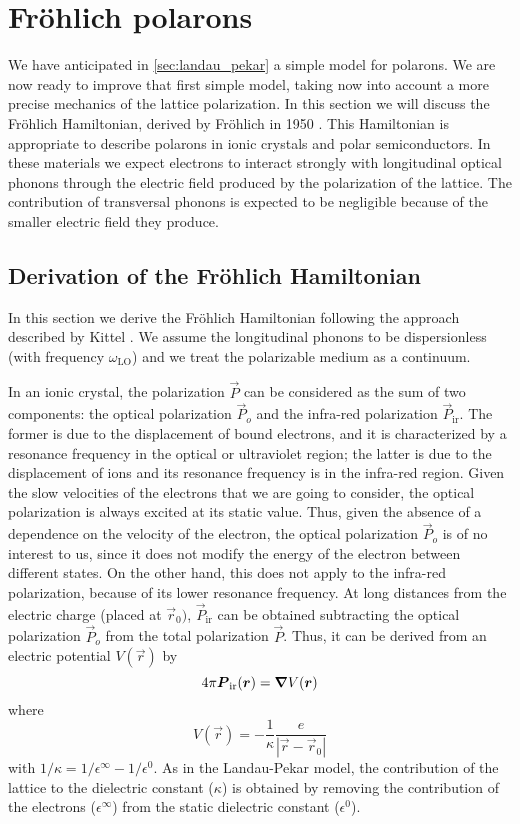 \section{Fröhlich polarons}
We have anticipated in \cref{sec:landau_pekar} a simple model for polarons. We are now ready to improve that first simple model, taking now into account a more precise mechanics of the lattice polarization. In this section we will discuss the Fröhlich Hamiltonian, derived by Fröhlich in 1950 \cite{frohlich1950}. This Hamiltonian is appropriate to describe polarons in ionic crystals and polar semiconductors. In these materials we expect electrons to interact strongly with longitudinal optical phonons through the electric field produced by the polarization of the lattice. The contribution of transversal phonons is expected to be negligible because of the smaller electric field they produce.

\subsection{Derivation of the Fröhlich Hamiltonian}
In this section we derive the Fröhlich Hamiltonian following the approach described by Kittel \cite{kittel1987}. We assume the longitudinal phonons to be dispersionless (with frequency $\omega_\text{LO}$) and we treat the polarizable medium as a continuum.

In an ionic crystal, the polarization $\vec{P}$ can be considered as the sum of two components: the optical polarization $\vec{P}_o$ and the infra-red polarization $\vec{P}_\text{ir}$. The former is due to the displacement of bound electrons, and it is characterized by a resonance frequency in the optical or ultraviolet region; the latter is due to the displacement of ions and its resonance frequency is in the infra-red region. Given the slow velocities of the electrons that we are going to consider, the optical polarization is always excited at its static value. Thus, given the absence of a dependence on the velocity of the electron, the optical polarization $\vec{P}_o$ is of no interest to us, since it does not modify the energy of the electron between different states. On the other hand, this does not apply to the infra-red polarization, because of its lower resonance frequency. At long distances from the electric charge (placed at $\vec{r}_0)$, $\vec{P}_\text{ir}$ can be obtained subtracting the optical polarization $\vec{P}_o$ from the total polarization $\vec{P}$. Thus, it can be derived from an electric potential $V(\vec{r})$ by
\begin{equation} \label{eq:polarization_potential}
    4\pi\mathbf{\boldsymbol{P}}_\text{ir}(\mathbf{\boldsymbol{r}}) = \grad V(\mathbf{\boldsymbol{r}})
\end{equation}
where
\begin{equation}
    V(\vec{r}) = -\frac{1}{\kappa} \frac{e}{|\vec{r}-\vec{r}_0|}
\end{equation}
with $1/\kappa = 1 / \epsilon^\infty - 1/\epsilon^0$. As in the Landau-Pekar model, the contribution of the lattice to the dielectric constant ($\kappa$) is obtained by removing the contribution of the electrons ($\epsilon^\infty$) from the static dielectric constant ($\epsilon^0$).


